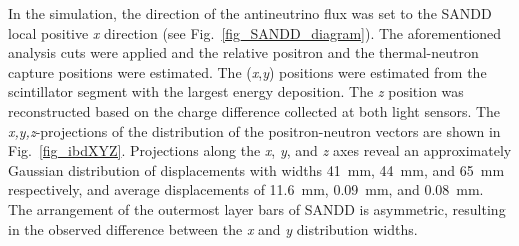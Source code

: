\documentclass[final,5p,times,twocolumn]{elsarticle}
\begin{document}
In the simulation, the direction of the antineutrino flux was set to the SANDD local positive \textit{x} direction (see Fig.~\ref{fig_SANDD_diagram}). The aforementioned analysis cuts were applied and the 
relative positron and the thermal-neutron capture positions were estimated. 
The (\textit{x},\textit{y}) positions were estimated from the scintillator segment with the largest energy deposition.
The \textit{z} position was reconstructed based on the charge difference collected at both light sensors. 
The \textit{x,y,z}-projections of the distribution of the positron-neutron vectors are shown in Fig.~\ref{fig_ibdXYZ}.
Projections along the \textit{x}, \textit{y}, and \textit{z} axes reveal an approximately Gaussian distribution of displacements with widths 41~mm, 44~mm, and 65~mm respectively, and average displacements of 11.6~mm, 0.09~mm, and 0.08~mm.
The arrangement of the outermost layer bars of SANDD is asymmetric, resulting in the observed difference between the \textit{x} and \textit{y} distribution widths.
\end{document}
